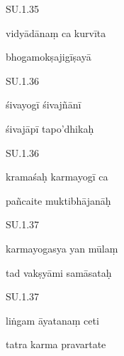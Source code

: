 \documentclass{article}
\begin{document}
	    
		SU.1.35 
    
	    
		vidyādānaṃ ca kurvīta 
    
	    
		bhogamokṣajigīṣayā 
    

    
	
	    
		SU.1.36 
    
	    
		śivayogī śivajñānī 
    
	    
		śivajāpī tapo'dhikaḥ 
    

    
	
	    
		SU.1.36 
    
	    
		kramaśaḥ karmayogī ca 
    
	    
		pañcaite muktibhājanāḥ 
    

    
	
	    
		SU.1.37 
    
	    
		karmayogasya yan mūlaṃ 
    
	    
		tad vakṣyāmi samāsataḥ 
    

    
	
	    
		SU.1.37 
    
	    
		liṅgam āyatanaṃ ceti 
    
	    
		tatra karma pravartate 
    
\end{document}
